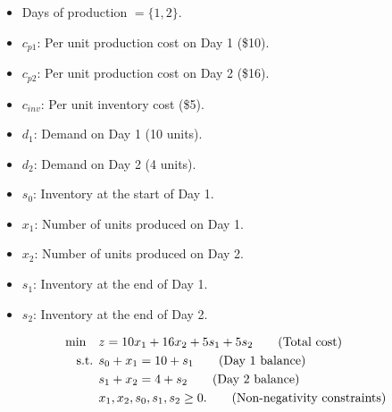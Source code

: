 \begin{solution}
\begin{itemize}
    \item Days of production $ = \{1, 2\}$.
\end{itemize}
\begin{itemize}
    \item $c_{p1}$: Per unit production cost on Day 1 (\$10).
    \item $c_{p2}$: Per unit production cost on Day 2 (\$16).
    \item $c_{inv}$: Per unit inventory cost (\$5).
    \item $d_1$: Demand on Day 1 (10 units).
    \item $d_2$: Demand on Day 2 (4 units).
        \item $s_0$: Inventory at the start of Day 1.
\end{itemize}

\begin{itemize}
    \item $x_1$: Number of units produced on Day 1.
    \item $x_2$: Number of units produced on Day 2.
    \item $s_1$: Inventory at the end of Day 1.
    \item $s_2$: Inventory at the end of Day 2.
\end{itemize}

\begin{align*}
\min \quad & z = 10x_1 + 16x_2 + 5s_1 + 5s_2   \tag{Total cost} \\
\mbox{ s.t. }        & s_0 + x_1 = 10 + s_1   \tag{Day 1 balance} \\
& s_1 + x_2 = 4 + s_2   \tag{Day 2 balance} \\
& x_1, x_2, s_0, s_1, s_2 \geq 0.   \tag{Non-negativity constraints}
\end{align*}

\end{solution}


